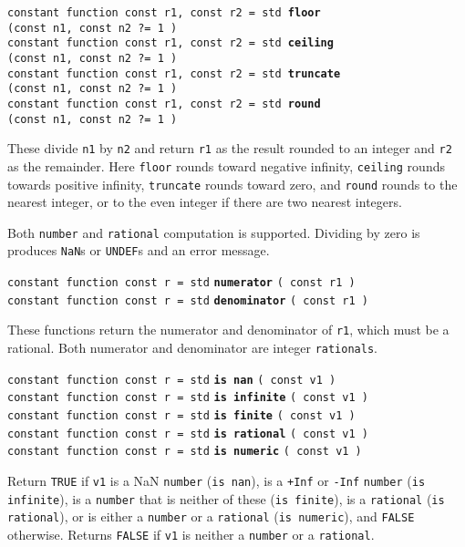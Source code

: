 \documentclass[12pt]{article}
\newcommand{\ttkey}[1]{{\tt \bfseries #1}}
\newenvironment{indpar}[1][0.3in]%
	{\begin{list}{}%
		     {\setlength{\itemsep}{0in}%
		      \setlength{\topsep}{0in}%
		      \setlength{\parsep}{1ex}%
		      \setlength{\labelwidth}{#1}%
		      \setlength{\leftmargin}{#1}%
		      \addtolength{\leftmargin}{\labelsep}}%
	 \item}%
	{\end{list}}
\begin{document}
{\tt constant function const r1, const r2 = std \ttkey{floor} \\
\hspace*{0.5in}(const n1, const n2 ?=~1 )} \\
{\tt constant function const r1, const r2 = std \ttkey{ceiling} \\
\hspace*{0.5in}(const n1, const n2 ?=~1 )} \\
{\tt constant function const r1, const r2 = std \ttkey{truncate} \\
\hspace*{0.5in}(const n1, const n2 ?=~1 )} \\
{\tt constant function const r1, const r2 = std \ttkey{round} \\
\hspace*{0.5in}(const n1, const n2 ?=~1 )}
\begin{indpar}
These divide {\tt n1} by {\tt n2} and return {\tt r1} as the
result rounded to an integer and {\tt r2} as the remainder.
Here {\tt floor} rounds toward negative infinity, {\tt ceiling}
rounds towards positive infinity, {\tt truncate} rounds toward
zero, and {\tt round} rounds to the nearest integer, or to the
even integer if there are two nearest integers.

Both {\tt number} and {\tt rational} computation is supported.
Dividing by zero is produces {\tt NaN}s or {\tt UNDEF}s and an
error message.
\end{indpar}

{\tt constant function const r = std} \ttkey{numerator} {\tt ( const r1 )} \\
{\tt constant function const r = std} \ttkey{denominator} {\tt ( const r1 )}
\begin{indpar}
These functions return the numerator and denominator of {\tt r1},
which must be a rational.
Both numerator and denominator are integer {\tt rationals}.
\end{indpar}

{\tt constant function const r = std} \ttkey{is nan} {\tt ( const v1 )} \\
{\tt constant function const r = std} \ttkey{is infinite} {\tt ( const v1 )} \\
{\tt constant function const r = std} \ttkey{is finite} {\tt ( const v1 )} \\
{\tt constant function const r = std} \ttkey{is rational} {\tt ( const v1 )} \\
{\tt constant function const r = std} \ttkey{is numeric} {\tt ( const v1 )}
\begin{indpar}
Return {\tt TRUE} if {\tt v1} is a NaN {\tt number} ({\tt is nan}),
is a {\tt +Inf} or {\tt -Inf} {\tt number} ({\tt is infinite}),
is a {\tt number} that is neither of these ({\tt is finite}),
is a {\tt rational} ({\tt is rational}),
or is either a {\tt number} or a {\tt rational} ({\tt is numeric}),
and {\tt FALSE}
otherwise.  Returns {\tt FALSE} if {\tt v1} is neither a {\tt number}
or a {\tt rational}.
\end{indpar}
\end{document}
